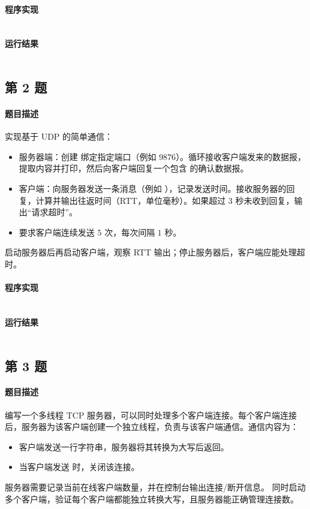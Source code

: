 \documentclass{academics}
\begin{document}
\paragraph{程序实现} {
    \inputminted[label=TcpEcho.java]{java}{../src/P01/TcpEcho.java}
}

\paragraph{运行结果} {
    \inputminted{text}{../res/P01.out}
}

\subsection{第 2 题}

\paragraph{题目描述} {
    实现基于 UDP 的简单通信：
    \begin{itemize}
        \item 服务器端：创建  绑定指定端口（例如 $9876$）。循环接收客户端发来的数据报，提取内容并打印，然后向客户端回复一个包含  的确认数据报。
        \item 客户端：向服务器发送一条消息（例如 ），记录发送时间。接收服务器的回复，计算并输出往返时间（RTT，单位毫秒）。如果超过 $3$ 秒未收到回复，输出``请求超时''。
        \item 要求客户端连续发送 $5$ 次，每次间隔 $1$ 秒。
    \end{itemize}
    启动服务器后再启动客户端，观察 RTT 输出；停止服务器后，客户端应能处理超时。
}

\paragraph{程序实现} {
    \inputminted[label=UdpPing.java]{java}{../src/P02/UdpPing.java}
}

\paragraph{运行结果} {
    \inputminted{text}{../res/P02.out}
}

\subsection{第 3 题}

\paragraph{题目描述} {
    编写一个多线程 TCP 服务器，可以同时处理多个客户端连接。每个客户端连接后，服务器为该客户端创建一个独立线程，负责与该客户端通信。通信内容为：
    \begin{itemize}
        \item 客户端发送一行字符串，服务器将其转换为大写后返回。
        \item 当客户端发送  时，关闭该连接。
    \end{itemize}
    服务器需要记录当前在线客户端数量，并在控制台输出连接/断开信息。
    同时启动多个客户端，验证每个客户端都能独立转换大写，且服务器能正确管理连接数。
}
\end{document}
